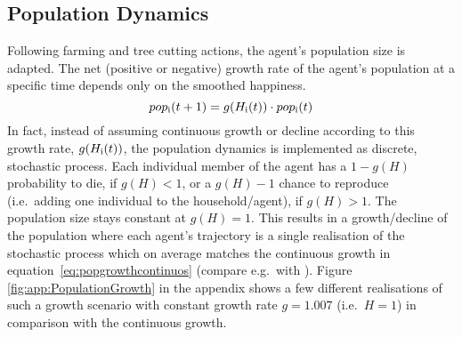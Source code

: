 \subsection{Population Dynamics}

Following farming and tree cutting actions, the agent's population size is adapted. 
The net (positive or negative) growth rate of the agent's population at a specific time depends only on the smoothed happiness. 
\begin{equation}\label{eq:popgrowthcontinuos}
pop_{\rm i}(t+1) = g(H_{\rm i}(t)) \cdot pop_{\rm i}(t)
\end{equation}
In fact, instead of assuming continuous growth or decline according to this growth rate, $g(H_{\rm i}(t))$, the population dynamics is implemented as discrete, stochastic process.
Each individual member of the agent has a $1-g(H)$ probability to die, if $g(H)<1$, or a $g(H)-1$ chance to reproduce (i.e.\ adding one individual to the household/agent), if $g(H)>1$.
The population size stays constant at $g(H)=1$. 
This results in a growth/decline of the population where each agent's trajectory is a single realisation of the stochastic process which on average matches the continuous growth in equation~\ref{eq:popgrowthcontinuos} (compare e.g.\ with \cite{Bungartz2013}).
Figure \ref{fig:app:PopulationGrowth} \TODO in the appendix shows a few different realisations of such a growth scenario with constant growth rate $g=1.007$ (i.e.\ $H=1$) in comparison with the continuous growth.


